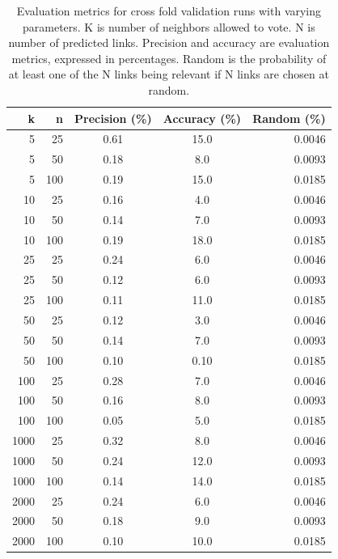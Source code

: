 \begin{table}[t]
\caption{Evaluation metrics for cross fold validation runs with varying parameters. K is number of neighbors allowed to vote. N is number of predicted links. Precision and accuracy are evaluation metrics, expressed in percentages. Random is the probability of at least one of the N links being relevant if N links are chosen at random.}
\label{results}
\vskip 0.15in
\begin{center}
\begin{small}
\begin{sc}
\begin{tabular}{rrccr}
\hline
k & n & Precision (\%) & Accuracy (\%) & Random (\%) \\
\hline
5      & 25 & 0.61 & 15.0 & 0.0046\\
5      & 50 & 0.18 & 8.0 & 0.0093 \\
5      & 100&0.19 & 15.0 & 0.0185\\
10    & 25 & 0.16& 4.0 & 0.0046\\
10    & 50 & 0.14 & 7.0 & 0.0093\\
10    & 100&0.19 & 18.0 & 0.0185 \\
25    & 25 & 0.24 & 6.0  & 0.0046\\
25    & 50 & 0.12 & 6.0  & 0.0093\\
25    &100&0.11 & 11.0  & 0.0185\\  
50    & 25 &0.12 & 3.0 & 0.0046\\
50    & 50 & 0.14 & 7.0  & 0.0093\\
50    &100& 0.10 & 0.10  & 0.0185\\
100 & 25 & 0.28 & 7.0  & 0.0046\\
100 & 50 & 0.16 & 8.0  & 0.0093\\
100 &100& 0.05 & 5.0  & 0.0185\\
1000&25&0.32 & 8.0  & 0.0046\\
1000&50&0.24& 12.0  & 0.0093\\
1000&100&0.14&14.0  & 0.0185\\
2000&25&0.24&6.0 & 0.0046\\
2000&50&0.18&9.0 & 0.0093\\
2000&100&0.10&10.0  & 0.0185\\
\hline
\end{tabular}
\end{sc}
\end{small}
\end{center}
\vskip -0.1in
\end{table}

